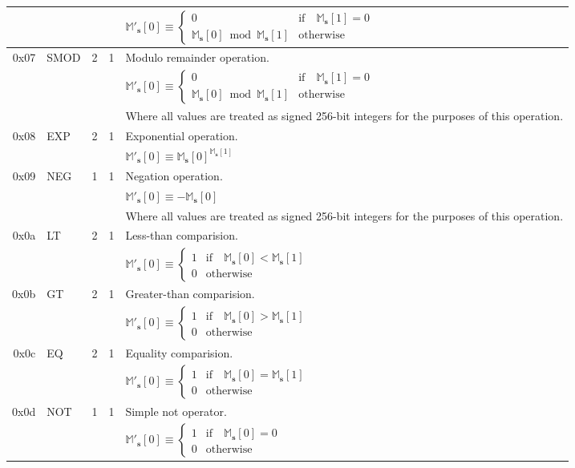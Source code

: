 \documentclass[9pt,oneside]{amsart}
\begin{document}
\begin{tabular*}{\columnwidth}[h]{rlrrl}
&&&& $\mathbb{M}'_\mathbf{s}[0] \equiv \begin{cases}0 & \text{if} \quad \mathbb{M}_\mathbf{s}[1] = 0\\ \mathbb{M}_\mathbf{s}[0] \bmod \mathbb{M}_\mathbf{s}[1] & \text{otherwise}\end{cases}$  \\
\midrule
0x07 & {\small SMOD} & 2 & 1 & Modulo remainder operation. \\
&&&& $\mathbb{M}'_\mathbf{s}[0] \equiv \begin{cases}0 & \text{if} \quad \mathbb{M}_\mathbf{s}[1] = 0\\ \mathbb{M}_\mathbf{s}[0] \bmod \mathbb{M}_\mathbf{s}[1] & \text{otherwise}\end{cases}$  \\
&&&& Where all values are treated as signed 256-bit integers for the purposes of this operation. \\
\midrule
0x08 & {\small EXP} & 2 & 1 & Exponential operation. \\
&&&& $\mathbb{M}'_\mathbf{s}[0] \equiv \mathbb{M}_\mathbf{s}[0] ^ {\mathbb{M}_\mathbf{s}[1] }$ \\
\midrule
0x09 & {\small NEG} & 1 & 1 & Negation operation. \\
&&&& $\mathbb{M}'_\mathbf{s}[0] \equiv -\mathbb{M}_\mathbf{s}[0]$ \\
&&&& Where all values are treated as signed 256-bit integers for the purposes of this operation. \\
\midrule
0x0a & {\small LT} & 2 & 1 & Less-than comparision. \\
&&&& $\mathbb{M}'_\mathbf{s}[0] \equiv \begin{cases} 1 & \text{if} \quad \mathbb{M}_\mathbf{s}[0] < \mathbb{M}_\mathbf{s}[1] \\ 0 & \text{otherwise} \end{cases}$ \\
\midrule
0x0b & {\small GT} & 2 & 1 & Greater-than comparision. \\
&&&& $\mathbb{M}'_\mathbf{s}[0] \equiv \begin{cases} 1 & \text{if} \quad \mathbb{M}_\mathbf{s}[0] > \mathbb{M}_\mathbf{s}[1] \\ 0 & \text{otherwise} \end{cases}$ \\
\midrule
0x0c & {\small EQ} & 2 & 1 & Equality comparision. \\
&&&& $\mathbb{M}'_\mathbf{s}[0] \equiv \begin{cases} 1 & \text{if} \quad \mathbb{M}_\mathbf{s}[0] = \mathbb{M}_\mathbf{s}[1] \\ 0 & \text{otherwise} \end{cases}$ \\
\midrule
0x0d & {\small NOT} & 1 & 1 & Simple not operator. \\
&&&& $\mathbb{M}'_\mathbf{s}[0] \equiv \begin{cases} 1 & \text{if} \quad \mathbb{M}_\mathbf{s}[0] = 0 \\ 0 & \text{otherwise} \end{cases}$ \\
\end{tabular*}
\end{document}
